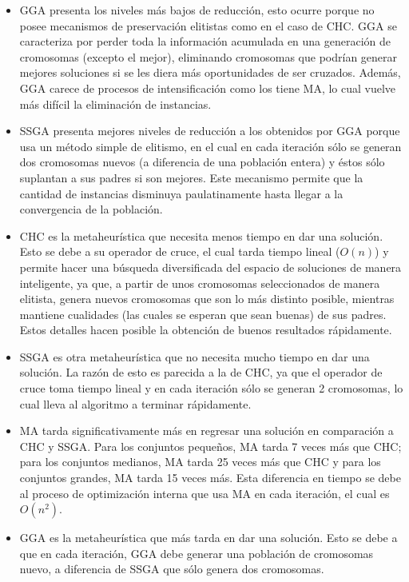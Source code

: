 \begin{itemize}
\item GGA presenta los niveles más bajos de reducción, esto ocurre porque no posee mecanismos de preservación elitistas como en el caso de CHC. GGA se caracteriza por perder toda la información acumulada en una generación de cromosomas (excepto el mejor), eliminando cromosomas que podrían generar mejores soluciones si se les diera más oportunidades de ser cruzados. Además, GGA carece de procesos de intensificación como los tiene MA, lo cual vuelve más difícil la eliminación de instancias.

\item SSGA presenta mejores niveles de reducción a los obtenidos por GGA porque usa un método simple de elitismo, en el cual en cada iteración sólo se generan dos cromosomas nuevos (a diferencia de una población entera) y éstos sólo suplantan a sus padres si son mejores. Este mecanismo permite que la cantidad de instancias disminuya paulatinamente hasta llegar a la convergencia de la población.

\item CHC es la metaheurística que necesita menos tiempo en dar una solución. Esto se debe a su operador de cruce, el cual tarda tiempo lineal ($O(n)$) y permite hacer una búsqueda diversificada del espacio de soluciones de manera inteligente, ya que, a partir de unos cromosomas seleccionados de manera elitista, genera nuevos cromosomas que son lo más distinto posible, mientras mantiene cualidades (las cuales se esperan que sean buenas) de sus padres. Estos detalles hacen posible la obtención de buenos resultados rápidamente.

\item SSGA es otra metaheurística que no necesita mucho tiempo en dar una solución. La razón de esto es parecida a la de CHC, ya que el operador de cruce toma tiempo lineal y en cada iteración sólo se generan 2 cromosomas, lo cual lleva al algoritmo a terminar rápidamente.

\item MA tarda significativamente más en regresar una solución en comparación a CHC y SSGA. Para los conjuntos pequeños, MA tarda 7 veces más que CHC; para los conjuntos medianos, MA tarda 25 veces más que CHC y para los conjuntos grandes, MA tarda 15 veces más. Esta diferencia en tiempo se debe al proceso de optimización interna que usa MA en cada iteración, el cual es $O(n^2)$.

\item GGA es la metaheurística que más tarda en dar una solución. Esto se debe a que en cada iteración, GGA debe generar una población de cromosomas nuevo, a diferencia de SSGA que sólo genera dos cromosomas.


\end{itemize}
